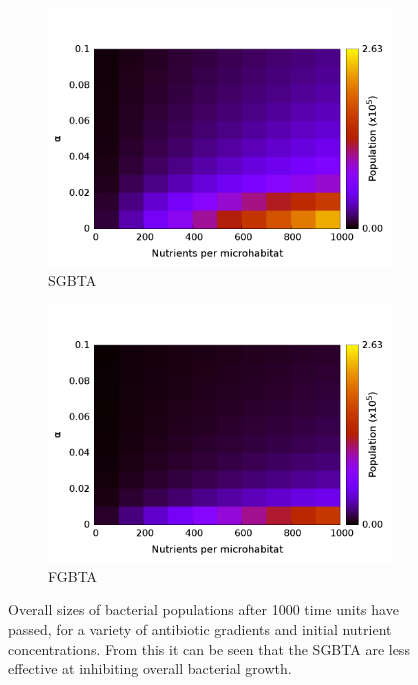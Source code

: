 \documentclass[a4paper,12pt]{article}
\begin{document}
\begin{figure}[H]
 \centering
 \begin{subfigure}[h]{0.49\textwidth}
 \includegraphics[width=\textwidth]{simple-slowGrowers-S_Vs_Alpha-contours}
  \caption{SGBTA}
  \label{subfig:SGBTA-alphagrad-contours}
  \end{subfigure}
  \begin{subfigure}[h]{0.49\textwidth}
  \includegraphics[width=\textwidth]{simple-fastGrowers-S_Vs_Alpha-contours}
  \caption{FGBTA}
  \label{subfig:FGBTA-alphagrad-contours}
 \end{subfigure}
\caption{Overall sizes of bacterial populations after 1000 time units have passed, for a variety of antibiotic gradients and initial nutrient concentrations.  
From this it can be seen that the SGBTA are less effective at inhibiting overall bacterial growth.}
\label{fig:alpha-popsize-contours}
\end{figure}
\end{document}

